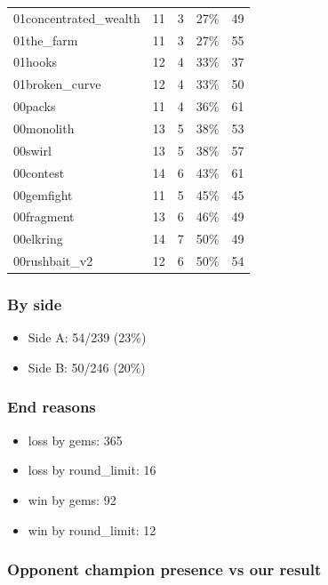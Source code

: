 \documentclass[
  10pt,
]{article}
\providecommand{\tightlist}{%
  \setlength{\itemsep}{0pt}\setlength{\parskip}{0pt}}
\begin{document}
{\begin{longtable}[]{@{}lllll@{}}
01concentrated\_wealth & 11 & 3 & 27\% & 49 \\
01the\_farm & 11 & 3 & 27\% & 55 \\
01hooks & 12 & 4 & 33\% & 37 \\
01broken\_curve & 12 & 4 & 33\% & 50 \\
00packs & 11 & 4 & 36\% & 61 \\
00monolith & 13 & 5 & 38\% & 53 \\
00swirl & 13 & 5 & 38\% & 57 \\
00contest & 14 & 6 & 43\% & 61 \\
00gemfight & 11 & 5 & 45\% & 45 \\
00fragment & 13 & 6 & 46\% & 49 \\
00elkring & 14 & 7 & 50\% & 49 \\
00rushbait\_v2 & 12 & 6 & 50\% & 54 \\
\end{longtable}
}

\subsubsection{By side}\label{by-side}

\begin{itemize}
\tightlist
\item
  Side A: 54/239 (23\%)
\item
  Side B: 50/246 (20\%)
\end{itemize}

\subsubsection{End reasons}\label{end-reasons}

\begin{itemize}
\tightlist
\item
  loss by gems: 365
\item
  loss by round\_limit: 16
\item
  win by gems: 92
\item
  win by round\_limit: 12
\end{itemize}

\subsubsection{Opponent champion presence vs our
result}\label{opponent-champion-presence-vs-our-result}
\end{document}

